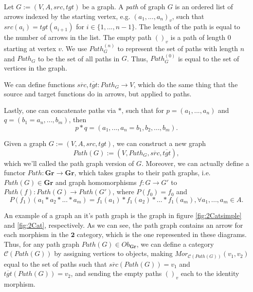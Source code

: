 \begin{definition}
  Let $G:=(V, A, src, tgt)$ be a graph. A \textit{path} of graph $G$
  is an ordered list of arrows indexed by the starting vertex, e.g. $(a_1,..., a_n)_v$,
  such that $src(a_i) = tgt(a_{i+1})$ for $i \in\{1,...,n-1\}$.
  The length of the path is equal to the
  number of arrows in the list. The empty path $()_v$ is a path of length 0 starting at vertex $v$.
  We use $Path^{(n)}_G$ to represent the set of paths with length $n$
  and $Path_G$ to be the set of all paths in $G$. Thus, $Path^{(0)}_G$ is equal to the set of vertices
  in the graph.

  We can define functions $\overline{src}, \overline{tgt}:Path_G \to V$,
  which do the same thing that the source and target functions do in arrows,
  but applied to paths.

  Lastly, one can concatenate paths via $*$, such that
  for $p = (a_1,...,a_n)$ and $q = (b_1=a_n,...,b_m)$, then
  \begin{displaymath}
    p * q = (a_1,...,a_n=b_1, b_2,...,b_m).
  \end{displaymath}
\end{definition}

\begin{definition}
  Given a graph $G:=(V, A, src, tgt)$, we can construct a new graph
  \begin{displaymath}
    Path(G) := (V, Path_G, \overline{src}, \overline{tgt}),
  \end{displaymath}
  which we'll called the path graph version of $G$.
  Moreover, we can actually define a functor $Path : \mathbf{Gr} \to \mathbf{Gr}$,
  which takes graphs to their path graphs, i.e. $Path(G) \in \mathbf {Gr}$ and
  graph homomorphisms $f:G \to G'$ to $Path(f):Path(G)\to Path(G')$, where
  $P(f_0) = f_0$ and
  \begin{displaymath}
    P(f_1)(a_1*a_2*...*a_m) = f_1(a_1)*f_1(a_2)*...*f_1(a_m), \forall a_1,...,a_m \in A.
  \end{displaymath}
  \label{def:PathFunctor}
\end{definition}

An example of a graph an it's path graph is the graph in figure \ref{fig:2Catsimple}
and \ref{fig:2Cat}, respectively. As we can see, the path graph contains an arrow for each
morphism in the $\mathbf{2}$ category, which is the one represented in these diagrams.
Thus, for any path graph $Path(G) \in Ob_\mathbf{Gr}$, we can define a category
$\mathcal C(Path(G))$ by assigning vertices to objects,
making $Mor_{\mathcal C(Path(G))}(v_1,v_2)$ equal to the set of paths such that
$\overline{src}(Path(G)) = v_1$ and $\overline{tgt}(Path(G)) = v_2$, and sending
the empty paths $()_v$ each to the identity morphism.

